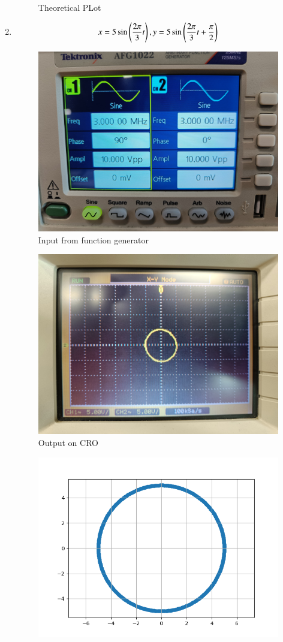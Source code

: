 \documentclass[journal]{IEEEtran}
\begin{document}
\begin{enumerate}
\begin{figure}[H]
        \caption{Theoretical PLot}
    \end{figure}
    \item \begin{align*}
        x = 5\sin\left(\frac{2\pi}{3}t\right), y = 5\sin\left(\frac{2\pi}{3}t+\frac{\pi}{2}\right)
    \end{align*}
    \begin{figure}[H]
        \centering
        \includegraphics[width=0.7\columnwidth]{pics/WhatsApp Image 2025-01-23 at 13.22.01(1).jpeg}
        \caption{Input from function generator}
    \end{figure}
    \begin{figure}[H]
        \centering
        \includegraphics[width=0.7\columnwidth]{pics/WhatsApp Image 2025-01-23 at 13.22.01.jpeg}
        \caption{Output on CRO}
    \end{figure}
    \begin{figure}[H]
        \centering
        \includegraphics[width=0.7\columnwidth]{figs/fig2.png}

\end{figure}
\end{enumerate}
\end{document}
